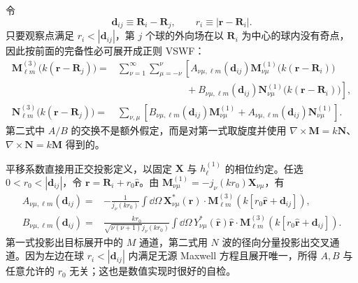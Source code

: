 令
\begin{equation}
\bm d_{ij}\equiv\bm R_i-\bm R_j,
\qquad
r_i\equiv|\bm r-\bm R_i|.
\end{equation}
只要观察点满足 $r_i<|\bm d_{ij}|$，第 $j$ 个球的外向场在以 $\bm R_i$ 为中心的球内没有奇点，因此按前面的完备性必可展开成正则 VSWF：
\begin{align}
\bm M_{\ell m}^{(3)}\!\bigl(k(\bm r-\bm R_j)\bigr)
={}&\sum_{\nu=1}^{\infty}\sum_{\mu=-\nu}^{\nu}
\left[
A_{\nu\mu,\ell m}(\bm d_{ij})
\bm M_{\nu\mu}^{(1)}\!\bigl(k(\bm r-\bm R_i)\bigr)
\right.\\
&\left.\hspace{7em}+
B_{\nu\mu,\ell m}(\bm d_{ij})
\bm N_{\nu\mu}^{(1)}\!\bigl(k(\bm r-\bm R_i)\bigr)
\right],\\
\bm N_{\ell m}^{(3)}\!\bigl(k(\bm r-\bm R_j)\bigr)
={}&\sum_{\nu,\mu}
\left[
B_{\nu\mu,\ell m}(\bm d_{ij})
\bm M_{\nu\mu}^{(1)}
+A_{\nu\mu,\ell m}(\bm d_{ij})
\bm N_{\nu\mu}^{(1)}
\right].
\label{eq:VSWF-translation-theorem}
\end{align}
第二式中 $A/B$ 的交换不是额外假定，而是对第一式取旋度并使用
$\nabla\times\bm M=k\bm N$、$\nabla\times\bm N=k\bm M$ 得到的。

平移系数直接用正交投影定义，以固定 $\bm X$ 与 $h_\ell^{(1)}$ 的相位约定。任选
$0<r_0<|\bm d_{ij}|$，令 $\bm r=\bm R_i+r_0\hat{\bm r}$。由
$\bm M_{\nu\mu}^{(1)}=-j_\nu(kr_0)\bm X_{\nu\mu}$，有
\begin{align}
A_{\nu\mu,\ell m}(\bm d_{ij})
={}&-\frac{1}{j_\nu(kr_0)}
\int\dd\Omega\,
\bm X_{\nu\mu}^*(\hat{\bm r})\cdot
\bm M_{\ell m}^{(3)}
\!\left(k[r_0\hat{\bm r}+\bm d_{ij}]\right),
\label{eq:translation-A-projection}\\
B_{\nu\mu,\ell m}(\bm d_{ij})
={}&\frac{kr_0}{\sqrt{\nu(\nu+1)}j_\nu(kr_0)}
\int\dd\Omega\,
Y_{\nu\mu}^*(\hat{\bm r})
\hat{\bm r}\cdot
\bm M_{\ell m}^{(3)}
\!\left(k[r_0\hat{\bm r}+\bm d_{ij}]\right).
\label{eq:translation-B-projection}
\end{align}
第一式投影出目标展开中的 $M$ 通道，第二式用 $N$ 波的径向分量投影出交叉通道。因为左边在球 $r_i<|\bm d_{ij}|$ 内满足无源 Maxwell 方程且展开唯一，所得 $A,B$ 与任意允许的 $r_0$ 无关；这也是数值实现时很好的自检。

